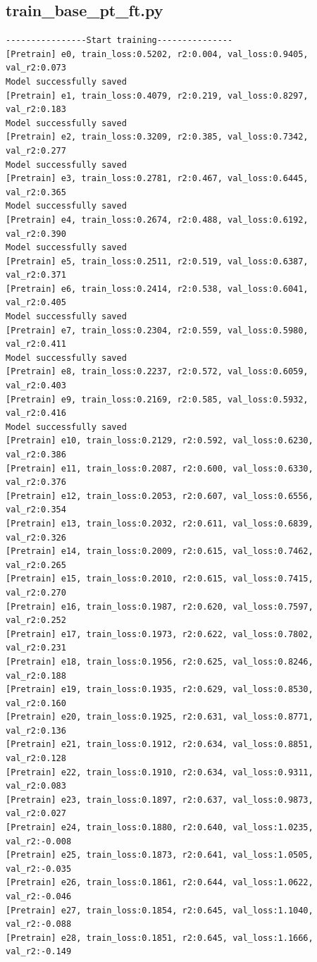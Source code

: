 \documentclass[a4paper, 12pt]{article}
\begin{document}
\subsection{train\_base\_pt\_ft.py}		
\begin{lstlisting}	
----------------Start training---------------
[Pretrain] e0, train_loss:0.5202, r2:0.004, val_loss:0.9405, val_r2:0.073
Model successfully saved
[Pretrain] e1, train_loss:0.4079, r2:0.219, val_loss:0.8297, val_r2:0.183
Model successfully saved
[Pretrain] e2, train_loss:0.3209, r2:0.385, val_loss:0.7342, val_r2:0.277
Model successfully saved
[Pretrain] e3, train_loss:0.2781, r2:0.467, val_loss:0.6445, val_r2:0.365
Model successfully saved
[Pretrain] e4, train_loss:0.2674, r2:0.488, val_loss:0.6192, val_r2:0.390
Model successfully saved
[Pretrain] e5, train_loss:0.2511, r2:0.519, val_loss:0.6387, val_r2:0.371
[Pretrain] e6, train_loss:0.2414, r2:0.538, val_loss:0.6041, val_r2:0.405
Model successfully saved
[Pretrain] e7, train_loss:0.2304, r2:0.559, val_loss:0.5980, val_r2:0.411
Model successfully saved
[Pretrain] e8, train_loss:0.2237, r2:0.572, val_loss:0.6059, val_r2:0.403
[Pretrain] e9, train_loss:0.2169, r2:0.585, val_loss:0.5932, val_r2:0.416
Model successfully saved
[Pretrain] e10, train_loss:0.2129, r2:0.592, val_loss:0.6230, val_r2:0.386
[Pretrain] e11, train_loss:0.2087, r2:0.600, val_loss:0.6330, val_r2:0.376
[Pretrain] e12, train_loss:0.2053, r2:0.607, val_loss:0.6556, val_r2:0.354
[Pretrain] e13, train_loss:0.2032, r2:0.611, val_loss:0.6839, val_r2:0.326
[Pretrain] e14, train_loss:0.2009, r2:0.615, val_loss:0.7462, val_r2:0.265
[Pretrain] e15, train_loss:0.2010, r2:0.615, val_loss:0.7415, val_r2:0.270
[Pretrain] e16, train_loss:0.1987, r2:0.620, val_loss:0.7597, val_r2:0.252
[Pretrain] e17, train_loss:0.1973, r2:0.622, val_loss:0.7802, val_r2:0.231
[Pretrain] e18, train_loss:0.1956, r2:0.625, val_loss:0.8246, val_r2:0.188
[Pretrain] e19, train_loss:0.1935, r2:0.629, val_loss:0.8530, val_r2:0.160
[Pretrain] e20, train_loss:0.1925, r2:0.631, val_loss:0.8771, val_r2:0.136
[Pretrain] e21, train_loss:0.1912, r2:0.634, val_loss:0.8851, val_r2:0.128
[Pretrain] e22, train_loss:0.1910, r2:0.634, val_loss:0.9311, val_r2:0.083
[Pretrain] e23, train_loss:0.1897, r2:0.637, val_loss:0.9873, val_r2:0.027
[Pretrain] e24, train_loss:0.1880, r2:0.640, val_loss:1.0235, val_r2:-0.008
[Pretrain] e25, train_loss:0.1873, r2:0.641, val_loss:1.0505, val_r2:-0.035
[Pretrain] e26, train_loss:0.1861, r2:0.644, val_loss:1.0622, val_r2:-0.046
[Pretrain] e27, train_loss:0.1854, r2:0.645, val_loss:1.1040, val_r2:-0.088
[Pretrain] e28, train_loss:0.1851, r2:0.645, val_loss:1.1666, val_r2:-0.149

\end{lstlisting}
\end{document}
